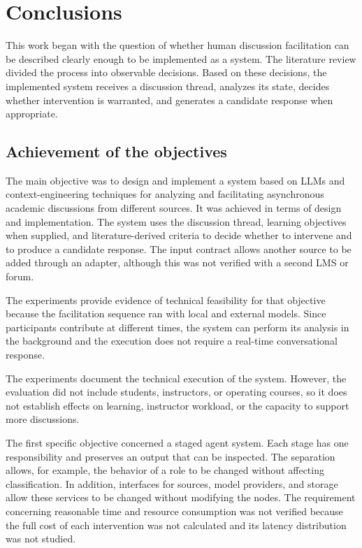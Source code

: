 \chapter{Conclusions}
\label{chap:conclusions-en}

This work began with the question of whether human discussion facilitation can be described clearly enough to be implemented as a system. The literature review divided the process into observable decisions. Based on these decisions, the implemented system receives a discussion thread, analyzes its state, decides whether intervention is warranted, and generates a candidate response when appropriate.

\section{Achievement of the objectives}

The main objective was to design and implement a system based on LLMs and context-engineering techniques for analyzing and facilitating asynchronous academic discussions from different sources. It was achieved in terms of design and implementation. The system uses the discussion thread, learning objectives when supplied, and literature-derived criteria to decide whether to intervene and to produce a candidate response. The input contract allows another source to be added through an adapter, although this was not verified with a second LMS or forum.

The experiments provide evidence of technical feasibility for that objective because the facilitation sequence ran with local and external models. Since participants contribute at different times, the system can perform its analysis in the background and the execution does not require a real-time conversational response.

The experiments document the technical execution of the system. However, the evaluation did not include students, instructors, or operating courses, so it does not establish effects on learning, instructor workload, or the capacity to support more discussions.

The first specific objective concerned a staged agent system. Each stage has one responsibility and preserves an output that can be inspected. The separation allows, for example, the behavior of a role to be changed without affecting classification. In addition, interfaces for sources, model providers, and storage allow these services to be changed without modifying the nodes. The requirement concerning reasonable time and resource consumption was not verified because the full cost of each intervention was not calculated and its latency distribution was not studied.

